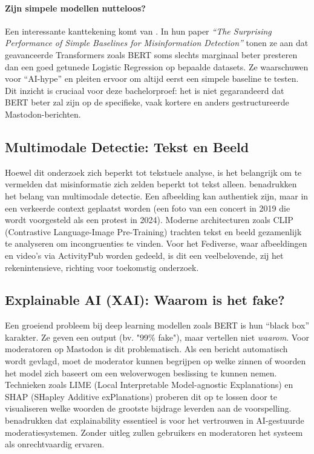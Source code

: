 \paragraph{Zijn simpele modellen nutteloos?}
Een interessante kanttekening komt van \textcite{pelrine2021surprising}. In hun paper \textit{``The Surprising Performance of Simple Baselines for Misinformation Detection''} tonen ze aan dat geavanceerde Transformers zoals BERT soms slechts marginaal beter presteren dan een goed getunede Logistic Regression op bepaalde datasets. Ze waarschuwen voor ``AI-hype'' en pleiten ervoor om altijd eerst een simpele baseline te testen. Dit inzicht is cruciaal voor deze bachelorproef: het is niet gegarandeerd dat BERT beter zal zijn op de specifieke, vaak kortere en anders gestructureerde Mastodon-berichten.

\subsection{Multimodale Detectie: Tekst en Beeld}
Hoewel dit onderzoek zich beperkt tot tekstuele analyse, is het belangrijk om te vermelden dat misinformatie zich zelden beperkt tot tekst alleen. \textcite{zhou2020similarity} benadrukken het belang van multimodale detectie. Een afbeelding kan authentiek zijn, maar in een verkeerde context geplaatst worden (een foto van een concert in 2019 die wordt voorgesteld als een protest in 2024).
Moderne architecturen zoals CLIP (Contrastive Language-Image Pre-Training) trachten tekst en beeld gezamenlijk te analyseren om incongruenties te vinden. Voor het Fediverse, waar afbeeldingen en video's via ActivityPub worden gedeeld, is dit een veelbelovende, zij het rekenintensieve, richting voor toekomstig onderzoek.

\subsection{Explainable AI (XAI): Waarom is het fake?}
Een groeiend probleem bij deep learning modellen zoals BERT is hun ``black box'' karakter. Ze geven een output (bv. "99\% fake"), maar vertellen niet \textit{waarom}. Voor moderatoren op Mastodon is dit problematisch. Als een bericht automatisch wordt gevlagd, moet de moderator kunnen begrijpen op welke zinnen of woorden het model zich baseert om een weloverwogen beslissing te kunnen nemen.
Technieken zoals LIME (Local Interpretable Model-agnostic Explanations) en SHAP (SHapley Additive exPlanations) proberen dit op te lossen door te visualiseren welke woorden de grootste bijdrage leverden aan de voorspelling. \textcite{shu2017fake} benadrukken dat explainability essentieel is voor het vertrouwen in AI-gestuurde moderatiesystemen. Zonder uitleg zullen gebruikers en moderatoren het systeem als onrechtvaardig ervaren.


